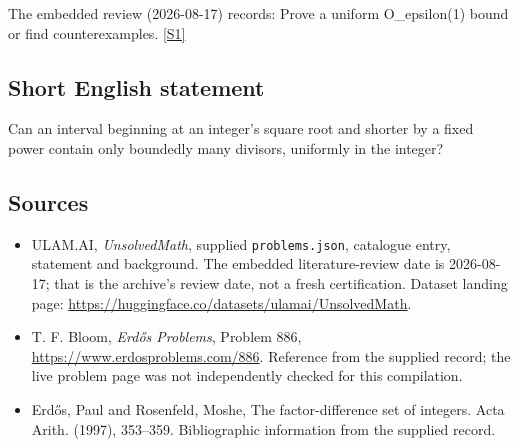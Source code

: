 \documentclass[11pt,a4paper]{article}
\newcommand{\sref}[2]{\hyperlink{source:#1:#2}{[S#2]}}
\begin{document}
The embedded review (2026-08-17) records: Prove a uniform O\_epsilon(1) bound or find counterexamples. \sref{statement}{1}

\subsection{Short English statement}

Can an interval beginning at an integer's square root and shorter by a fixed power contain only boundedly many divisors, uniformly in the integer?

\subsection{Sources}

{\small

\begin{itemize}

\item[\hypertarget{source:statement:1}{S1}] ULAM.AI, \emph{UnsolvedMath}, supplied \texttt{problems.json}, catalogue entry, statement and background. The embedded literature-review date is 2026-08-17; that is the archive’s review date, not a fresh certification. Dataset landing page: \url{https://huggingface.co/datasets/ulamai/UnsolvedMath}.

\item[\hypertarget{source:statement:2}{S2}] T. F. Bloom, \emph{Erdős Problems}, Problem 886, \url{https://www.erdosproblems.com/886}. Reference from the supplied record; the live problem page was not independently checked for this compilation.

\item[\hypertarget{source:statement:3}{S3}] Erd\H{o}s, Paul and Rosenfeld, Moshe, The factor-difference set of integers. Acta Arith. (1997), 353--359. Bibliographic information from the supplied record.

\end{itemize}

}

\label{end:statement}
\end{document}
